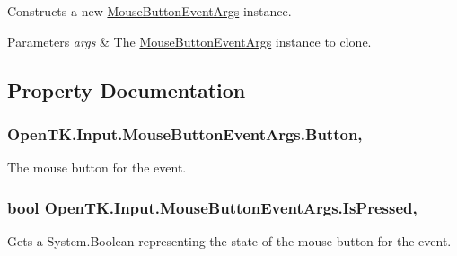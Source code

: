 Constructs a new \hyperlink{class_open_t_k_1_1_input_1_1_mouse_button_event_args}{Mouse\-Button\-Event\-Args} instance. 


\begin{DoxyParams}{Parameters}
{\em args} & The \hyperlink{class_open_t_k_1_1_input_1_1_mouse_button_event_args}{Mouse\-Button\-Event\-Args} instance to clone.\\
\hline
\end{DoxyParams}


\subsection{Property Documentation}
\hypertarget{class_open_t_k_1_1_input_1_1_mouse_button_event_args_aeae9a397f99f0b0f6026d2f5bda7293b}{
\subsubsection[{Button}]{ Open\-T\-K.\-Input.\-Mouse\-Button\-Event\-Args.\-Button\hspace{0.3cm}{\ttfamily [get]}, {\ttfamily [set]}}}\label{class_open_t_k_1_1_input_1_1_mouse_button_event_args_aeae9a397f99f0b0f6026d2f5bda7293b}


The mouse button for the event. 

\hypertarget{class_open_t_k_1_1_input_1_1_mouse_button_event_args_a2c64b9baa8da00ed048ba612771a27a7}{
\subsubsection[{Is\-Pressed}]{\setlength{\rightskip}{0pt plus 5cm}bool Open\-T\-K.\-Input.\-Mouse\-Button\-Event\-Args.\-Is\-Pressed\hspace{0.3cm}{\ttfamily [get]}, {\ttfamily [set]}}}\label{class_open_t_k_1_1_input_1_1_mouse_button_event_args_a2c64b9baa8da00ed048ba612771a27a7}


Gets a System.\-Boolean representing the state of the mouse button for the event. 

